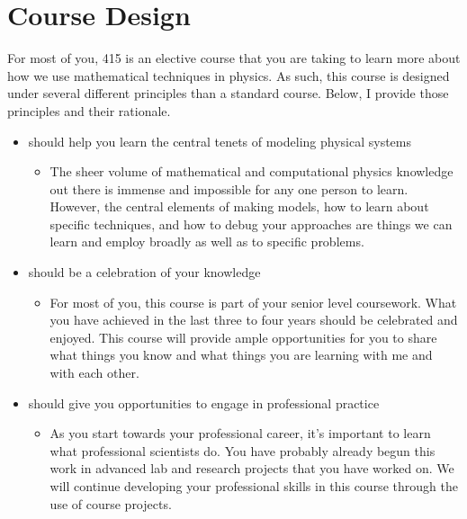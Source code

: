 \documentclass[letterpaper,10pt,english]{jupyterBook}
\begin{document}
\sphinxstepscope


\section{Course Design}
\label{\detokenize{content/0_course/2_design:course-design}}\label{\detokenize{content/0_course/2_design::doc}}
\sphinxAtStartPar
For most of you, 415 is an elective course that you are taking to learn more about how we use mathematical techniques in physics. As such, this course is designed under several different principles than a standard course. Below, I provide those principles and their rationale.
\begin{itemize}
\item {} 
 should help you learn the central tenets of modeling physical systems
\begin{itemize}
\item {} 
\sphinxAtStartPar
The sheer volume of mathematical and computational physics knowledge out there is immense and impossible for any one person to learn. However, the central elements of making models, how to learn about specific techniques, and how to debug your approaches are things we can learn and employ broadly as well as to specific problems.

\end{itemize}

\item {} 
 should be a celebration of your knowledge
\begin{itemize}
\item {} 
\sphinxAtStartPar
For most of you, this course is part of your senior level coursework. What you have achieved in the last three to four years should be celebrated and enjoyed. This course will provide ample opportunities for you to share what things you know and what things you are learning with me and with each other.

\end{itemize}

\item {} 
 should give you opportunities to engage in professional practice
\begin{itemize}
\item {} 
\sphinxAtStartPar
As you start towards your professional career, it’s important to learn what professional scientists do. You have probably already begun this work in advanced lab and research projects that you have worked on. We will continue developing your professional skills in this course through the use of course projects.


\end{itemize}
\end{itemize}
\end{document}
